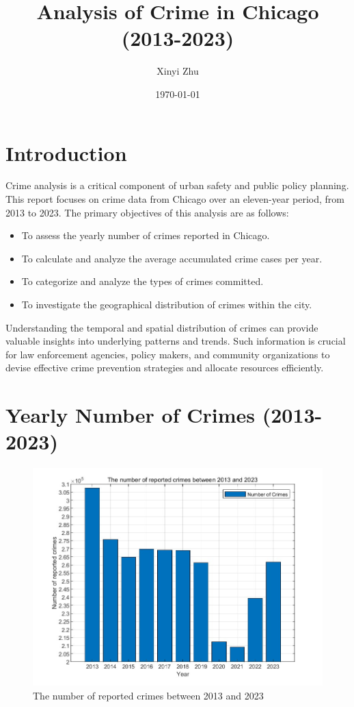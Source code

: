 \documentclass{article}
\title{Analysis of Crime in Chicago (2013-2023)}
\author{Xinyi Zhu}
\date{\today}
\begin{document}
\maketitle

\section{Introduction}

Crime analysis is a critical component of urban safety and public policy planning. This report focuses on crime data from Chicago over an eleven-year period, from 2013 to 2023. The primary objectives of this analysis are as follows:
\begin{itemize}
    \item To assess the yearly number of crimes reported in Chicago.
    \item To calculate and analyze the average accumulated crime cases per year.
    \item To categorize and analyze the types of crimes committed.
    \item To investigate the geographical distribution of crimes within the city.
\end{itemize}

Understanding the temporal and spatial distribution of crimes can provide valuable insights into underlying patterns and trends. Such information is crucial for law enforcement agencies, policy makers, and community organizations to devise effective crime prevention strategies and allocate resources efficiently.

\section{Yearly Number of Crimes (2013-2023)}


\begin{figure}
    \centering
    \includegraphics[width=0.8\linewidth]{Yearly_crimeNumber_bar.jpg}
    \caption{The number of reported crimes between 2013 and 2023}
    \label{fig:yearly_crimes}
\end{figure}
\end{document}
